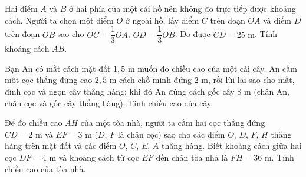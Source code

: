 \begin{bt}%
	Hai điểm $A$ và $B$ ở hai phía của một cái hồ nên không đo trực tiếp được khoảng cách. Người ta chọn một điểm $O$ ở ngoài hồ, lấy điểm $C$ trên đoạn $OA$ và điểm $D$ trên đoạn $OB$ sao cho $OC=\dfrac13OA$, $OD=\dfrac13OB$. Đo được $CD=25\text{ m}$. Tính khoảng cách $AB$.
\end{bt}

\begin{bt}%
	Bạn An có mắt cách mặt đất $1{,}5\text{ m}$ muốn đo chiều cao của một cái cây. An cắm một cọc thẳng đứng cao $2{,}5\text{ m}$ cách chỗ mình đứng $2\text{ m}$, rồi lùi lại sao cho mắt, đỉnh cọc và ngọn cây thẳng hàng; khi đó An đứng cách gốc cây $8\text{ m}$ (chân An, chân cọc và gốc cây thẳng hàng). Tính chiều cao của cây.
\end{bt}

\begin{bt}%
	Để đo chiều cao $AH$ của một tòa nhà, người ta cắm hai cọc thẳng đứng $CD=2\text{ m}$ và $EF=3\text{ m}$ ($D$, $F$ là chân cọc) sao cho các điểm $O$, $D$, $F$, $H$ thẳng hàng trên mặt đất và các điểm $O$, $C$, $E$, $A$ thẳng hàng. Biết khoảng cách giữa hai cọc $DF=4\text{ m}$ và khoảng cách từ cọc $EF$ đến chân tòa nhà là $FH=36\text{ m}$. Tính chiều cao của tòa nhà.
\end{bt}

